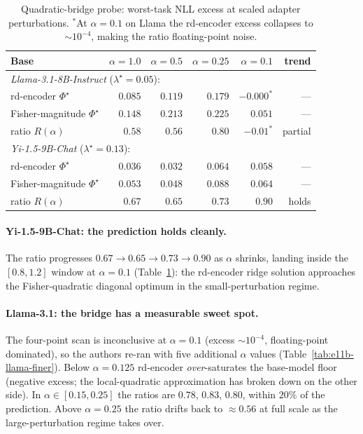 \begin{table}[h]
\centering
\caption{Quadratic-bridge probe: worst-task NLL excess at scaled
adapter perturbations. $^*$At $\alpha = 0.1$ on Llama the rd-encoder
excess collapses to $\sim 10^{-4}$, making the ratio floating-point
noise.}
\label{tab:e11-quadbridge}
\begin{tabular}{lrrrr|r}
\hline
Base & $\alpha=1.0$ & $\alpha=0.5$ & $\alpha=0.25$ & $\alpha=0.1$ & trend \\
\hline
\multicolumn{6}{l}{\textit{Llama-3.1-8B-Instruct} ($\lambda^\star = 0.05$):} \\
\quad rd-encoder $\Phi^\star$       & $0.085$ & $0.119$ & $0.179$ & $-0.000^*$ & --- \\
\quad Fisher-magnitude $\Phi^\star$ & $0.148$ & $0.213$ & $0.225$ & $0.051$  & --- \\
\quad ratio $R(\alpha)$             & $0.58$  & $0.56$  & $0.80$  & $-0.01^*$ & partial \\
\hline
\multicolumn{6}{l}{\textit{Yi-1.5-9B-Chat} ($\lambda^\star = 0.13$):} \\
\quad rd-encoder $\Phi^\star$       & $0.036$ & $0.032$ & $0.064$ & $0.058$  & --- \\
\quad Fisher-magnitude $\Phi^\star$ & $0.053$ & $0.048$ & $0.088$ & $0.064$  & --- \\
\quad ratio $R(\alpha)$             & $0.67$  & $0.65$  & $0.73$  & $\mathbf{0.90}$ & holds \\
\hline
\end{tabular}
\end{table}

\paragraph{Yi-1.5-9B-Chat: the prediction holds cleanly.} The ratio
progresses $0.67 \to 0.65 \to 0.73 \to 0.90$ as $\alpha$ shrinks,
landing inside the $[0.8, 1.2]$ window at $\alpha = 0.1$
(Table~\ref{tab:e11-quadbridge}): the rd-encoder ridge solution
approaches the Fisher-quadratic diagonal optimum in the
small-perturbation regime.

\paragraph{Llama-3.1: the bridge has a measurable sweet spot.} The
four-point scan is inconclusive at $\alpha = 0.1$ (excess
$\sim 10^{-4}$, floating-point dominated), so the authors re-ran with five
additional $\alpha$ values (Table~\ref{tab:e11b-llama-finer}). Below
$\alpha = 0.125$ rd-encoder \emph{over}-saturates the base-model floor
(negative excess; the local-quadratic approximation has broken down on
the other side). In $\alpha \in [0.15, 0.25]$ the ratios are $0.78$,
$0.83$, $0.80$, within $20\%$ of the prediction. Above
$\alpha = 0.25$ the ratio drifts back to $\approx 0.56$ at full scale
as the large-perturbation regime takes over.

